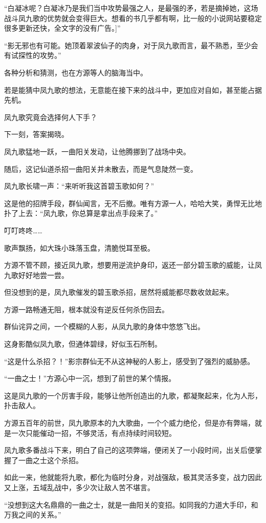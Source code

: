 \begin{this_body}
“白凝冰呢？白凝冰乃是我们当中攻势最强之人，是最强的矛，若是摘掉她，这场战斗凤九歌的优势就会变得巨大。想看的书几乎都有啊，比一般的小说网站要稳定很多更新还快，全文字的没有广告。]”

“影无邪也有可能。她顶着翠波仙子的肉身，对于凤九歌而言，最不熟悉，至少会有试探性的攻势。”

各种分析和猜测，也在方源等人的脑海当中。

若是能猜中凤九歌的想法，无意能在接下来的战斗中，更加应对自如，甚至能占据先机。

凤九歌究竟会选择何人下手？

下一刻，答案揭晓。

凤九歌猛地一跃，一曲阳关发动，让他腾挪到了战场中央。

随后，这记仙道杀招一曲阳关并未散去，而是气息陡然一变。

凤九歌长啸一声：“来听听我这首碧玉歌如何？”

这是他的招牌手段，群仙闻言，无不后撤。唯有方源一人，哈哈大笑，勇悍无比地扑了上去：“凤九歌，你总算是拿出点手段来了。”

叮叮咚咚……

歌声飘扬，如大珠小珠落玉盘，清脆悦耳至极。

方源不管不顾，接近凤九歌，想要用逆流护身印，返还一部分碧玉歌的威能，让凤九歌好好地尝一尝。

但没想到的是，凤九歌催发的碧玉歌杀招，居然将威能都尽数收敛起来。

方源一路畅通无阻，根本就没有逆反任何杀伤回去。

群仙诧异之间，一个模糊的人影，从凤九歌的身体中悠悠飞出。

这身影酷似凤九歌，但通体碧绿，好似玉石所制。

“这是什么杀招？！”影宗群仙无不从这神秘的人影上，感受到了强烈的威胁感。

“一曲之士！”方源心中一沉，想到了前世的某个情报。

这是凤九歌的一个厉害手段，能够让他所创造出的九歌，都凝聚起来，化为人形，扑击敌人。

方源五百年的前世，凤九歌原本的九大歌曲，一个个威力绝伦，但是亦有弊端，就是一次只能催动一招，不够灵活，有点持续时间较短。

凤九歌多番战斗下来，明白了自己的这项弊端，便闭关了一小段时间，出关后便掌握了一曲之士这个杀招。

如此一来，他就能将九歌，都化为临时分身，对战强敌，极其灵活多变，战力因此又上涨，五域乱战中，多少次让敌人苦不堪言。

“没想到这大名鼎鼎的一曲之士，就是一曲阳关的变招。如同我的力道大手印，和万我之间的关系。”


\end{this_body}
